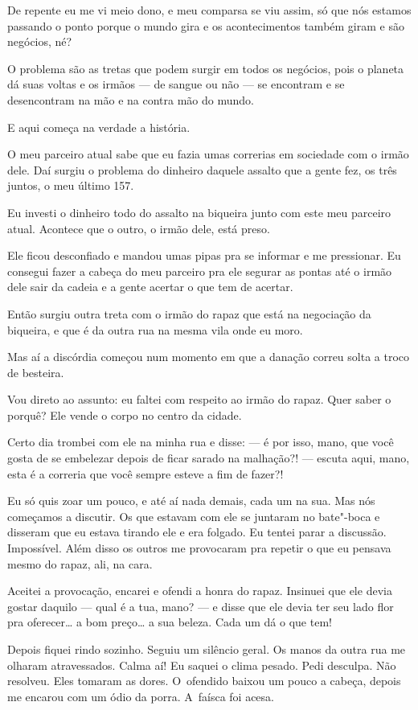 De repente eu me vi meio dono, e meu comparsa se viu assim, só que nós
estamos passando o ponto porque o mundo gira e os acontecimentos também
giram e são negócios, né?

O problema são as tretas que podem surgir em todos os negócios, pois o
planeta dá suas voltas e os irmãos --- de sangue ou não --- se encontram
e se desencontram na mão e na contra mão do mundo.

E aqui começa na verdade a história.

O meu parceiro atual sabe que eu fazia umas correrias em sociedade com o
irmão dele. Daí surgiu o problema do dinheiro daquele assalto que a
gente fez, os três juntos, o meu último 157.

Eu investi o dinheiro todo do assalto na biqueira junto com este meu
parceiro atual. Acontece que o outro, o irmão dele, está preso.

Ele ficou desconfiado e mandou umas pipas pra se informar e me
pressionar. Eu consegui fazer a cabeça do meu parceiro pra ele segurar
as pontas até o irmão dele sair da cadeia e a gente acertar o que tem de
acertar.

Então surgiu outra treta com o irmão do rapaz que está na negociação da
biqueira, e que é da outra rua na mesma vila onde eu moro.

Mas aí a discórdia começou num momento em que a danação correu solta a
troco de besteira.

Vou direto ao assunto: eu faltei com respeito ao irmão do rapaz. Quer
saber o porquê? Ele vende o corpo no centro da cidade.

Certo dia trombei com ele na minha rua e disse: --- é por isso, mano,
que você gosta de se embelezar depois de ficar sarado na malhação?! ---
escuta aqui, mano, esta é a correria que você sempre esteve a fim de
fazer?!

Eu só quis zoar um pouco, e até aí nada demais, cada um na sua. Mas nós
começamos a discutir. Os que estavam com ele se juntaram no bate"-boca e
disseram que eu estava tirando ele e era folgado. Eu tentei parar a
discussão. Impossível. Além disso os outros me provocaram pra repetir o
que eu pensava mesmo do rapaz, ali, na cara.

Aceitei a provocação, encarei e ofendi a honra do rapaz. Insinuei que
ele devia gostar daquilo --- qual é a tua, mano? --- e disse que ele
devia ter seu lado flor pra oferecer… a bom preço… a sua
beleza. Cada um dá o que tem!

Depois fiquei rindo sozinho. Seguiu um silêncio geral. Os manos da outra
rua me olharam atravessados. Calma aí! Eu saquei o clima pesado. Pedi
desculpa. Não resolveu. Eles tomaram as dores. O~ofendido baixou um
pouco a cabeça, depois me encarou com um ódio da porra. A~faísca foi
acesa.

